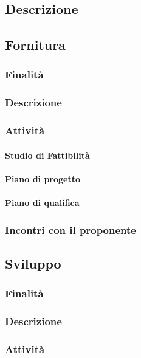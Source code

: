 \documentclass[../norme-di-progetto.tex]{subfiles}
\begin{document}
\subsection{Descrizione}
\label{sub:descrizione}
\subsection{Fornitura}
\label{sub:fornitura}
\subsubsection{Finalità}
\label{subs:finalità}
\subsubsection{Descrizione}
\label{subs:descrizione}
\subsubsection{Attività}
\label{subs:attività}
\paragraph{Studio di Fattibilità}
\label{par:studio di fattibilità}
\paragraph{Piano di progetto}
\label{par:piano di progetto}
\paragraph{Piano di qualifica}
\label{par:piano di qualifica}
\subsubsection{Incontri con il proponente}
\label{subs:incontri con il proponente}
\subsection{Sviluppo}
\label{sub:sviluppo}
\subsubsection{Finalità}
\label{subs:finalità}
\subsubsection{Descrizione}
\label{subs:descrizione}
\subsubsection{Attività}
\label{subs:attività}
\end{document}
